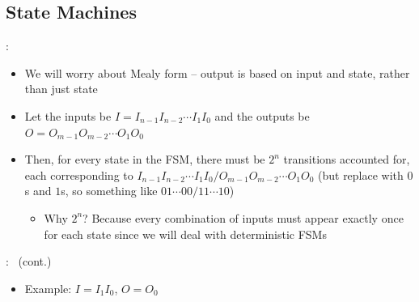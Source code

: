 \documentclass{../slides}
\begin{document}
\subsection{State Machines}
\begin{frame}{\secname: \subsecname}
    \begin{itemize}
        \item We will worry about Mealy form -- output is based on input and state, rather than just state
        \item Let the inputs be $I = I_{n-1}I_{n-2}\cdots I_1I_0$ and the outputs be $O = O_{m-1}O_{m-2}\cdots O_1O_0$
        \item Then, for every state in the FSM, there must be $2^{n}$ transitions accounted for, each corresponding to $I_{n-1}I_{n-2}\cdots I_1I_0 / O_{m-1}O_{m-2}\cdots O_1O_0$ (but replace with $0$s and $1$s, so something like $01\cdots 00 / 11\cdots 10$)
        \begin{itemize}
            \item Why $2^{n}$? Because every combination of inputs must appear exactly once for each state since we will deal with deterministic FSMs
        \end{itemize}
    \end{itemize}
\end{frame}

\begin{frame}{\secname: \subsecname\ (cont.)}
    \begin{itemize}
        \item Example: $I = I_1I_0$, $O = O_0$
        \begin{figure}[H]
            \centering
        \end{figure}
    \end{itemize}
\end{frame}
\end{document}
